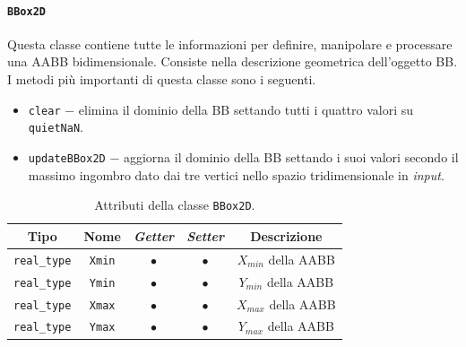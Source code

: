\paragraph{\texttt{BBox2D}}
Questa classe contiene tutte le informazioni per definire, manipolare e processare una \ac{AABB} bidimensionale. Consiste nella descrizione geometrica dell'oggetto \ac{BB}. I metodi più importanti di questa classe sono i seguenti.
\begin{itemize}
	\item \texttt{clear} $-$ elimina il dominio della \ac{BB} settando tutti i quattro valori su \texttt{quietNaN}.
	\item \texttt{updateBBox2D} $-$ aggiorna il dominio della \ac{BB} settando i suoi valori secondo il massimo ingombro dato dai tre vertici nello spazio tridimensionale in \textit{input}.
\end{itemize}
\begin{table}[h!]
	\centering
	\begin{tabular}{|c|c|c|c|c|}
		\hline 
		\textbf{Tipo} & \textbf{Nome} & \textit{\textbf{Getter}} & \textit{\textbf{Setter}} & \textbf{Descrizione} \\ \hline 
		\texttt{real\_type} & \texttt{Xmin} & $\bullet$ & $\bullet$ & $X_{min}$ della \ac{AABB} \\ \hline 
		\texttt{real\_type} & \texttt{Ymin} & $\bullet$ & $\bullet$ & $Y_{min}$ della \ac{AABB} \\ \hline
		\texttt{real\_type} & \texttt{Xmax} & $\bullet$ & $\bullet$ & $X_{max}$ della \ac{AABB} \\ \hline
		\texttt{real\_type} & \texttt{Ymax} & $\bullet$ & $\bullet$ & $Y_{max}$ della \ac{AABB} \\ \hline
	\end{tabular}
	\caption{Attributi della classe \texttt{BBox2D}.}
	\label{BBox2D}
\end{table}
%
